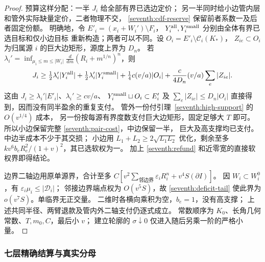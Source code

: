\begin{proof}
预算这样分配：一半 \(J_i\) 给全部有界已选边定价；
另一半同时给小边管内层和管外实际缺量定价，二者物理不交，
\eqref{seventh:cdf-reserve} 保留前者系数一及后者固定份额。
明确地，令 \(E'_i=(x_i+W_i')\setminus F_i\)，
\(Y_i^{\rm all},Y_i^{\rm small}\) 分别由全体有界已选目标和仅小边目标
重新构造；两者可以不同。设 \(O_i=E'_i\setminus\mathcal C_i(K_*)\)，
\(Z_{ie}\subset O_i\) 为归属源 \(i\) 的巨大边矩形，源度上界为 \(D_n\)。
若 \(\lambda_i'=\inf_{\mu_i\le m\le|W_i|}\frac{d}{dm}(R_i+m^{1/n})^n\)，则
\[
 J_i\ge\tfrac12\lambda_i'|Y_i^{\rm all}|
       +\tfrac12\lambda_i'|Y_i^{\rm small}|
       +\tfrac14c(v/a)|O_i|
       +\frac{c}{4D_n}(v/a)\sum_e|Z_{ie}|.
\]
这由 \(J_i\ge\lambda_i'|E'_i|\)、\(\lambda_i'\ge cv/a\)、
\(Y_i^{\rm small}\sqcup O_i\subset E'_i\) 及
\(\sum_e|Z_{ie}|\le D_n|O_i|\) 直接得到，因而没有同半盈余的重复支付。
管外一份付引理~\ref{seventh:high-support} 的 \(O(v^{1/4})\) 成本，
另一份按每源有界度数支付巨大边矩形，固定足够大 \(T\) 即可。
所以小边保留完整 \eqref{seventh:pair-cost}，中边保留一半，
巨大及高支撑均已支付。中边半成本不少于其交损；
小边用 \(L_1+L_2\ge2\sqrt{L_1L_2}\) 优化，剩余至多
\(kv^6b_eR_e^2/(1+v)^2\)，其已选软权为一。
加上 \eqref{seventh:refund} 和近零宽的直接软权界即得结论。

边界二轴边用原单源界，合计至多
\(C[v^2\sum_\text{邻边界}\varepsilon_iR_i^n+v^4S(\partial I)]\)。
因 \(W_i\subset W_i^0\)，有 \(\varepsilon_i\mu_i\le|\mathscr D_i|\)；
邻接边界端点权为 \(O(v^5S)\)，故 \eqref{seventh:deficit-tail}
使此界为 \(o(v^7S)\)。单临界无正交量。
二维时各横向乘积为空，\(b_e=1\)，没有高支撑；
上述共同半径、两臂退款及管内外二轴支付仍逐式成立。
常数顺序为 \(K_0\)、长角几何常数、\(T,m_0,C\)，最后小 \(v\)；
建立轮廓的 \(\sigma\downarrow0\) 仅进入随后另乘一阶的严格小量。
\end{proof}

\subsubsection{七层精确结算与真实分母}

